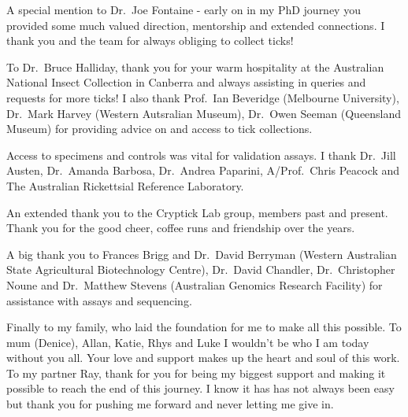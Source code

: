 \documentclass[a4paper, nobind]{templates/ociamthesis}
\begin{document}
\begin{romanpages}
\begin{acknowledgements}
  A special mention to Dr.~Joe Fontaine - early on in my PhD journey you provided some much valued direction, mentorship and extended connections. I thank you and the team for always obliging to collect ticks!

  To Dr.~Bruce Halliday, thank you for your warm hospitality at the Australian National Insect Collection in Canberra and always assisting in queries and requests for more ticks! I also thank Prof.~Ian Beveridge (Melbourne University), Dr.~Mark Harvey (Western Autsralian Museum), Dr.~Owen Seeman (Queensland Museum) for providing advice on and access to tick collections.

  Access to specimens and controls was vital for validation assays. I thank Dr.~Jill Austen, Dr.~Amanda Barbosa, Dr.~Andrea Paparini, A/Prof.~Chris Peacock and The Australian Rickettsial Reference Laboratory.

  An extended thank you to the Cryptick Lab group, members past and present. Thank you for the good cheer, coffee runs and friendship over the years.

  A big thank you to Frances Brigg and Dr.~David Berryman (Western Australian State Agricultural Biotechnology Centre), Dr.~David Chandler, Dr.~Christopher Noune and Dr.~Matthew Stevens (Australian Genomics Research Facility) for assistance with assays and sequencing.

  Finally to my family, who laid the foundation for me to make all this possible.
  To mum (Denice), Allan, Katie, Rhys and Luke I wouldn't be who I am today without you all. Your love and support makes up the heart and soul of this work.
  To my partner Ray, thank for you for being my biggest support and making it possible to reach the end of this journey.
  I know it has has not always been easy but thank you for pushing me forward and never letting me give in.
\end{acknowledgements}


  \dominitoc %

\flushbottom

\tableofcontents


\end{romanpages}
\end{document}
